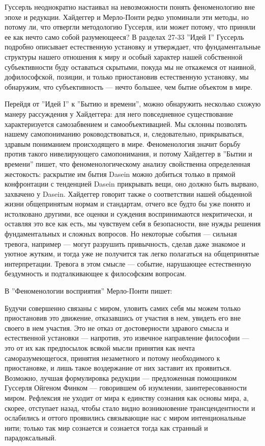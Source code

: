 \documentclass[11pt]{book}
\begin{document}
\relax
{}\relax
\smallskip

Гуссерль неоднократно настаивал на невозможности понять феноменологию вне эпохе и редукции. Хайдеггер и Мерло-Понти редко упоминали эти методы, но потому ли, что отвергли методологию Гуссерля, или может потому, что приняли ее как нечто само собой разумеющееся? В разделах 27-33 ''Идей I'' Гуссерль подробно описывает естественную установку и утверждает, что фундаментальные структуры нашего отношения к миру и особый характер нашей собственной субъективности буду оставаться скрытыми, покуда мы не откажемся от наивной, дофилософской, позиции, и только приостановив естественную установку, мы обнаружим, что субъективность --- нечто большее, чем бытие объектом в мире.

Перейдя от ''Идей I'' к ''Бытию и времени'', можно обнаружить несколько схожую манеру рассуждения у Хайдеггера: для него повседневное существование характеризуется самозабвением и самообъективацией. Мы склонны позволять нашему самопониманию роководствоваться, и, следовательно, прикрываться, здравым пониманием происходящего в мире. Феноменология значит борьбу против такого нивелирующего самопонимания, и потому Хайдеггер в ''Бытии и времени'' пишет, что феноменологическому анализу свойственна определенная жестокость: раскрытие им бытия Dasein можно добиться только в прямой конфронтации с тенденцией Dasein прикрывать вещи, оно должно быть вырвано, захвачено у Dasein. Хайдеггер говорит также о соответствии нашей обыденной жизни общепринятым нормам и стандартам, отчего все будто бы уже понято и истолковано другими, все оценки и суждения воспринимаются некритически, и оставляя это все как есть, мы чувствуем себя в безопасности, вне нужды решения фундаментальных и сложных вопросов. Но некоторые события --- сильная тревога, например --- могут разрушить привычность, сделав даже знакомое и уютное жутким, и тогда уже не получится так легко полагаться на общепринятые интерпретации. Тревога в этом смысле --- событие, нарушающее естественную бездумность и подталкивающее к философским вопросам.

В ''Феноменологии восприятия'' Мерло-Понти пишет:

\smallskip
{}\relax
{}\relax

Будучи совершенно связаны с миром, уловить самих себя мы можем только приостановив это движение, отказавшись от участия в нем, увидеть его вне своего в нем участия. Это не отказ от достоверности здравого смысла и естественной установки --- напротив, это извечное направление философии --- это от их как предпосылок всякой мысли принятия как нечта саморазумеющегося, принятия незаметного и потому необходимого к приостановке, и лишь такое воздержание от них заставит их проявиться. Возможно, лучшая формулировка редукции --- предложенная помощником Гуссерля Ойгеном Финком --- говорившем об изумлении, заинтересованности миром. Рефлексия не уходит от мира к единству сознания как основы мира, а, скорее, отступает назад, чтобы стало видно возникновение трансцендентности и ослабились и оттого проявились связывающие нас с миром интенциональные нити; только так мир сознается и сознается тогда как странный и парадоксальный.
\end{document}
